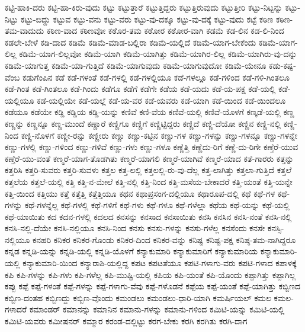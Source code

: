 {ಕಟ್ಟಿ-ಹಾಕಿ-ದರು
ಕಟ್ಟಿ-ಹಾ-ಕಿರು-ವುದು
ಕಟ್ಟು
ಕಟ್ಟುತ್ತಾರೆ
ಕಟ್ಟುತ್ತಿದ್ದರು
ಕಟ್ಟುತ್ತಿರುವುದು
ಕಟ್ಟುತ್ತೀರಿ
ಕಟ್ಟು-ನಿಟ್ಟನ್ನು
ಕಟ್ಟು-ನಿಟ್ಟು
ಕಟ್ಟು-ಬಿದ್ದು
ಕಟ್ಟುವ
ಕಟ್ಟು-ವನು
ಕಟ್ಟು-ವರು
ಕಟ್ಟು-ವು-ದಕ್ಕೂ
ಕಟ್ಟು-ವು-ದಕ್ಕೆ
ಕಟ್ಟು-ವುದು
ಕಟ್ಟೆ
ಕಠಿಣ
ಕಠಿಣ-ತಮ-ವಾದುದು
ಕಠಿಣ-ವಾದ
ಕಠಿಣವೋ
ಕಠೊರ-ತಮ
ಕಠೋರ
ಕಠೋರ-ವಾಗಿ
ಕಡಮೆ
ಕಡ-ಲಿನ
ಕಡ-ಲಿ-ನಿಂದ
ಕಡಲೇ-ಬೇಳೆ
ಕಡಿ-ದಾದ
ಕಡಿಮೆ
ಕಡಿಮೆ-ಮಾಡ-ಬಲ್ಲಿರಾ
ಕಡಿಮೆ-ಯಲ್ಲಿದೆ
ಕಡಿಮೆ-ಯಾಗ-ಬೇಕೆಂದು
ಕಡಿಮೆ-ಯಾಗ-ಲಿಲ್ಲ
ಕಡಿಮೆ-ಯಾಗ-ಲಿಲ್ಲವೋ
ಕಡಿಮೆ-ಯಾಗಿ
ಕಡಿಮೆ-ಯಾಗಿತ್ತು
ಕಡಿಮೆ-ಯಾಗಿರ-ಲಿಲ್ಲ
ಕಡಿಮೆ-ಯಾಗಿರು-ವು-ದನ್ನು
ಕಡಿಮೆ-ಯಾಗುತ್ತ
ಕಡಿಮೆ-ಯಾ-ಗುತ್ತಿದೆ
ಕಡಿಮೆ-ಯಾಗುವುದು
ಕಡಿಮೆ-ಯಾಗುವುದೋ
ಕಡಿಮೆ-ಯೇನೂ
ಕಡು-ಕಷ್ಟ-ವೆಂಬ
ಕಡುಗೆಂಪಿನ
ಕಡೆ
ಕಡೆ-ಗಳಂತೆ
ಕಡೆ-ಗಳಲ್ಲಿ
ಕಡೆ-ಗಳಲ್ಲಿಯೂ
ಕಡೆ-ಗಳಲ್ಲೂ
ಕಡೆ-ಗಳಿಂದ
ಕಡೆ-ಗಳಿ-ಗಿಂತಲೂ
ಕಡೆ-ಗಿಂತ
ಕಡೆ-ಗಿಂತಲೂ
ಕಡೆ-ಗಿಂದು
ಕಡೆಗೂ
ಕಡೆಗೆ
ಕಡೆಗೇ
ಕಡೆಯ
ಕಡೆ-ಯದು
ಕಡೆ-ಯ-ಪಕ್ಷ
ಕಡೆ-ಯಲ್ಲಿ
ಕಡೆ-ಯಲ್ಲಿಯೂ
ಕಡೆ-ಯಲ್ಲಿಯೇ
ಕಡೆ-ಯಲ್ಲೆ
ಕಡೆ-ಯ-ವರ
ಕಡೆ-ಯವರು
ಕಡೆ-ಯಾಗಿ
ಕಡೆ-ಯಿಂದ
ಕಡೆ-ಯಿಂದಲೂ
ಕಡೆಯೂ
ಕಡೆಯೇ
ಕಡ್ಡಿ
ಕಡ್ಡಿಯ
ಕಡ್ಡಿ-ಯನ್ನು
ಕಣಿವೆ
ಕಣಿ-ವೆಯ
ಕಣಿವೆ-ಯಲ್ಲಿ
ಕಣಿವೆ-ಯೊಳಗೆ
ಕಣ್ಕಡೆ-ಯಲ್ಲಿ
ಕಣ್ಣ
ಕಣ್ಣನ್ನು
ಕಣ್ಣನ್ನೂ
ಕಣ್ಣ-ಮುಂದೆ
ಕಣ್ಣಾರೆ
ಕಣ್ಣಿಗೂ
ಕಣ್ಣಿಗೆ
ಕಣ್ಣಿಟ್ಟಿದ್ದರು
ಕಣ್ಣಿದೆ
ಕಣ್ಣಿ-ದೆಯೋ
ಕಣ್ಣಿನ
ಕಣ್ಣಿ-ನಲ್ಲಿ
ಕಣ್ಣಿ-ನಿಂದ
ಕಣ್ಣಿ-ನೊಳಗೆ
ಕಣ್ಣೀ-ರನ್ನು
ಕಣ್ಣೀರು
ಕಣ್ಣು
ಕಣ್ಣು-ಕಟ್ಟಿನ
ಕಣ್ಣು-ಗಳ
ಕಣ್ಣು-ಗಳನ್ನು
ಕಣ್ಣು-ಗಳನ್ನೂ
ಕಣ್ಣು-ಗಳನ್ನೇ
ಕಣ್ಣು-ಗಳಲ್ಲಿ
ಕಣ್ಣು-ಗಳಿಂದ
ಕಣ್ಣು-ಗಳಿವೆ
ಕಣ್ಣು-ಗಳು
ಕಣ್ಣು-ಗಳೂ
ಕಣ್ಣೆತ್ತಿ
ಕಣ್ಣೆದು-ರಿಗೆ
ಕಣ್ಣೆ-ದು-ರಿಗೇ
ಕಣ್ತೆರೆ-ಯುವ
ಕಣ್ತೆರೆ-ಯು-ವಂತೆ
ಕಣ್ಮರೆ-ಯಾಗ-ತೊಡಗಿತು
ಕಣ್ಮರೆ-ಯಾಗಲಿ
ಕಣ್ಮರೆ-ಯಾಗಿವೆ
ಕಣ್ಮರೆ-ಯಾದ
ಕತೆ-ಗಾರರು
ಕತ್ತನ್ನು
ಕತ್ತರಿಸಿ
ಕತ್ತರಿ-ಸುವರು
ಕತ್ತರಿ-ಸುವಳು
ಕತ್ತಲ
ಕತ್ತ-ಲಲ್ಲಿ
ಕತ್ತಲಲ್ಲಿ-ರು-ವು-ದೆಲ್ಲ
ಕತ್ತ-ಲಾಗಿತ್ತು
ಕತ್ತಲಾ-ಗುತ್ತಿದೆ
ಕತ್ತಲೆ
ಕತ್ತಲೆಯ
ಕತ್ತಲೆ-ಯಲ್ಲಿ
ಕತ್ತಿ
ಕತ್ತಿ-ನ-ಮೇಲೆ
ಕತ್ತಿ-ನಲ್ಲಿ
ಕತ್ತಿ-ನಿಂದ
ಕತ್ತಿ-ಮಸೆಯ-ಬೇಕಾದರೆ
ಕತ್ತಿ-ಯಂತೆ
ಕತ್ತಿ-ಯನ್ನೇ
ಕತ್ತಿ-ಯಿಂದ
ಕತ್ತಿಯು
ಕತ್ತೆ
ಕತ್ತೆತ್ತಿ
ಕತ್ತೆತ್ತಿಯೂ
ಕಥನ
ಕಥಾಪ್ರಸಂಗ-ದಲ್ಲಿಯೂ
ಕಥಾರೂಪ-ದಲ್ಲಿ
ಕಥೆ
ಕಥೆ-ಗಳ
ಕಥೆ-ಗಳನ್ನು
ಕಥೆ-ಗಳನ್ನೆಲ್ಲ
ಕಥೆ-ಗಳಲ್ಲಿ
ಕಥೆ-ಗಳಿಗೆ
ಕಥೆ-ಗಳು
ಕಥೆ-ಗಳೂ
ಕಥೆ-ಗಳೆಲ್ಲಾ
ಕಥೆಯ
ಕಥೆ-ಯನ್ನು
ಕಥೆ-ಯಲ್ಲಿ
ಕಥೆ-ಯಾಯಿತು
ಕದ
ಕದನ-ಗಳಲ್ಲಿ
ಕದಲದ
ಕನಸನ್ನು
ಕನಸಾದ
ಕನಸಾಯಿತು
ಕನಸಿ
ಕನಸಿನ
ಕನಸಿ-ನಂತೆ
ಕನಸಿ-ನಲ್ಲಿ
ಕನಸಿ-ನಲ್ಲಿ-ದೆಯೇ
ಕನಸಿ-ನಲ್ಲಿಯೂ
ಕನಸಿ-ನಿಂದ
ಕನಸು
ಕನಸು-ಗಳನ್ನು
ಕನಸು-ಗಳೆಲ್ಲ
ಕನಸೆಂದು
ಕನಸೇ
ಕನಸ್ಸಿ-ನಲ್ಲಿಯೂ
ಕನಹರಿ
ಕನಿಕರ
ಕನಿಕರ-ಗೊಂಡು
ಕನಿಕರ-ದಿಂದ
ಕನಿಕರ-ವನ್ನು
ಕನಿಷ್ಟ
ಕನಿಷ್ಟ-ಪಕ್ಷ
ಕನಿಷ್ಠ-ತಮ-ನಾಗಿದ್ದರೂ
ಕನ್ನಡ
ಕನ್ನಡಿ-ಯನ್ನು
ಕನ್ನಡಿ-ಯಲ್ಲಿ
ಕನ್ನಡಿ-ಯೊಳಗೆ
ಕನ್ಯಾಕುಮಾರಿ
ಕನ್ಯಾಕುಮಾರಿಗೆ
ಕನ್ಯಾಕುಮಾರಿಯ
ಕನ್ಯಾಕುಮಾರಿ-ಯಲ್ಲಿ
ಕನ್ಯಾಕುಮಾರಿ-ಯಿಂದ
ಕನ್ಯಾರಾಶಿ-ಯಲ್ಲಿದ್ದ
ಕಪಟ
ಕಪಟತೆಯೂ
ಕಪಟಿ-ಗಳಾಗು-ವರು
ಕಪಟಿ-ಗಳಾದ
ಕಪಾಳಕ್ಕೆ
ಕಪಿ
ಕಪಿ-ಗಳನ್ನು
ಕಪಿ-ಗಳು
ಕಪಿ-ಗಳೆಲ್ಲ
ಕಪಿ-ಮುಷ್ಟಿ-ಯಲ್ಲಿ
ಕಪಿಯ
ಕಪಿ-ಯಂತೆ
ಕಪಿ-ಯೊಂದು
ಕಪ್ಪಾಗಿತ್ತು
ಕಪ್ಪಾಗಿಲ್ಲ
ಕಪ್ಪು
ಕಪ್ಪೆ
ಕಪ್ಪೆ-ಗಳಂತೆ
ಕಪ್ಪೆ-ಗಳನ್ನು
ಕಪ್ಪೆ-ಗಳಾಗು-ವೆವು
ಕಪ್ಪೆ-ಗಳೊಡನೆ
ಕಪ್ಪೆಯ
ಕಪ್ಪೆ-ಯಂತೆ
ಕಪ್ಪೆ-ಯಾಗಿತ್ತು
ಕಬ್ಬಿಣದ
ಕಬ್ಬಿಣ-ದಂತಹ
ಕಬ್ಬಿಣದ್ದು
ಕಬ್ಬಿಣ-ವೊಂದು
ಕಮಂಡಲು
ಕಮಂಡಲು-ಧಾರಿ-ಯಾಗಿ
ಕಮರ್ಷಿಯಲ್
ಕಮಲ
ಕಮಲ-ಗಳಾದರೆ
ಕಮಾಂಡರ್
ಕಮಾನನ್ನು
ಕಮಾನಿನ
ಕಮಾನು-ಗಳನ್ನು
ಕಮಾನು-ಗಳಿಂದ
ಕಮಿಟಿ-ಯನ್ನು
ಕಮಿಟಿ-ಯಲ್ಲಿ
ಕಮಿಟಿ-ಯವರು
ಕಮೀಷನರ್
ಕಮ್ಮಾರ
ಕರಂಡ-ದಲ್ಲಿಟ್ಟು
ಕರಗ-ಬೇಕು
ಕರಗಿ
ಕರಗಿತು
ಕರಗಿ-ದಾಗ
}
